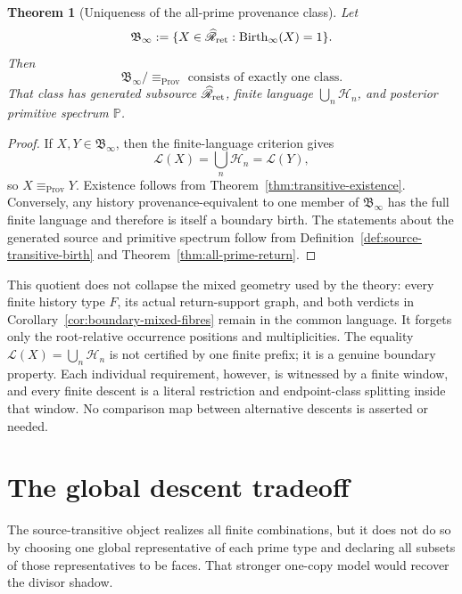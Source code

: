 \documentclass[11pt]{article}
\newtheorem{theorem}{Theorem}[section]
\newcommand{\Birth}{\operatorname{Birth}}
\newcommand{\Prov}{\operatorname{Prov}}
\begin{document}
\begin{theorem}[Uniqueness of the all-prime provenance class]
\label{thm:unique-provenance-class}
Let
\[
\mathfrak B_\infty
:=
\{X\in\widehat{\mathscr R}_{\rm ret}:\Birth_\infty(X)=1\}.
\]
Then
\[
\boxed{
\mathfrak B_\infty/{\equiv_{\Prov}}
\text{ consists of exactly one class}.}
\]
That class has generated subsource
\(\widehat{\mathscr R}_{\rm ret}\), finite language
\(\bigcup_n\mathscr H_n\), and posterior primitive spectrum \(\mathbb P\).
\end{theorem}

\begin{proof}
If \(X,Y\in\mathfrak B_\infty\), then the finite-language criterion gives
\[
\mathcal L(X)
=
\bigcup_n\mathscr H_n
=
\mathcal L(Y),
\]
so \(X\equiv_{\Prov}Y\).  Existence follows from
Theorem~\ref{thm:transitive-existence}.  Conversely, any history
provenance-equivalent to one member of \(\mathfrak B_\infty\) has the full
finite language and therefore is itself a boundary birth.  The statements
about the generated source and primitive spectrum follow from
Definition~\ref{def:source-transitive-birth} and
Theorem~\ref{thm:all-prime-return}.
\end{proof}

This quotient does not collapse the mixed geometry used by the theory: every
finite history type \(F\), its actual return-support graph, and both verdicts
in Corollary~\ref{cor:boundary-mixed-fibres} remain in the common language.
It forgets only the root-relative occurrence positions and multiplicities.
The equality \(\mathcal L(X)=\bigcup_n\mathscr H_n\) is not certified by one
finite prefix; it is a genuine boundary property.  Each individual
requirement, however, is witnessed by a finite window, and every finite
descent is a literal restriction and endpoint-class splitting inside that
window.  No comparison map between alternative descents is asserted or
needed.

\section{The global descent tradeoff}

The source-transitive object realizes all finite combinations, but it does not
do so by choosing one global representative of each prime type and declaring
all subsets of those representatives to be faces.  That stronger one-copy
model would recover the divisor shadow.
\end{document}
